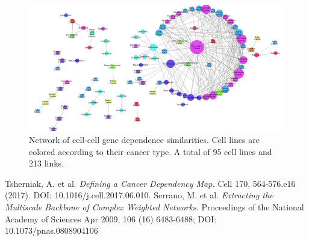 \documentclass[12pt]{article}
\begin{document}
\begin{figure}[h]
\centering
\includegraphics[width=1\columnwidth]{fig1.pdf} 
 \caption*{\scriptsize Network of cell-cell gene dependence similarities. Cell lines are colored according to their cancer type. A total of 95 cell lines and 213 links.}
\end{figure}


 
\begin{thebibliography}{99}
\vspace{-2ex}
\scriptsize
{} Tsherniak, A. et al. {\textit{Defining a Cancer Dependency Map.}} Cell 170, 564-576.e16 (2017). DOI: 10.1016/j.cell.2017.06.010.
\vspace{-2ex}
 Serrano, M. et al. {\textit{Extracting the Multiscale Backbone of Complex Weighted Networks}}. Proceedings of the National Academy of Sciences Apr 2009, 106 (16) 6483-6488; DOI: 10.1073/pnas.0808904106

\end{thebibliography}
\end{document}
